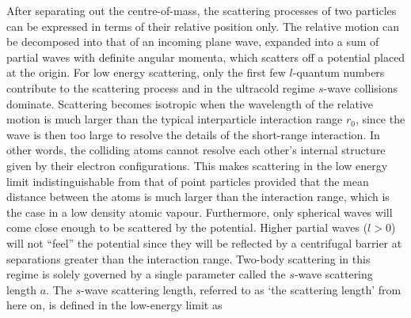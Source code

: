 After separating out the centre-of-mass, the scattering processes of two particles can be expressed in terms of their relative position only. The relative motion can be decomposed into that of an incoming plane wave, expanded into a sum of partial waves with definite angular momenta, which scatters off a potential placed at the origin. For low energy scattering, only the first few $l$-quantum numbers contribute to the scattering process and in the ultracold regime $s$-wave collisions dominate. Scattering becomes isotropic when the wavelength of the relative motion is much larger than the typical interparticle interaction range $r_0$, since the wave is then too large to resolve the details of the short-range interaction. In other words, the colliding atoms cannot resolve each other's internal structure given by their electron configurations. This makes scattering in the low energy limit indistinguishable from that of point particles provided that the mean distance between the atoms is much larger than the interaction range, which is the case in a low density atomic vapour. Furthermore, only spherical waves will come close enough to be scattered by the potential. Higher partial waves ($l>0$) will not ``feel'' the potential since they will be reflected by a centrifugal barrier at separations greater than the interaction range. Two-body scattering in this regime is solely governed by a single parameter called the $s$-wave scattering length $a$. The $s$-wave scattering length, referred to as `the scattering length' from here on, is defined in the low-energy limit as

